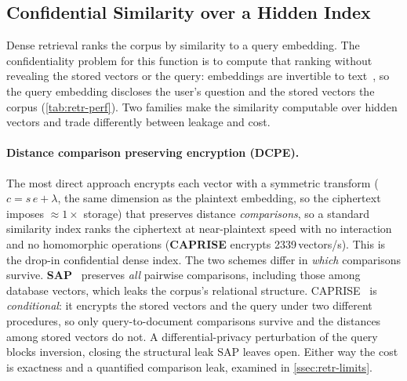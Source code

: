 \subsection{Confidential Similarity over a Hidden Index}
\label{ssec:retr-similarity}
Dense retrieval ranks the corpus by similarity to a query embedding. The confidentiality problem for this
function is to compute that ranking without revealing the stored vectors or the query: embeddings
are invertible to text~\citep{vec2text}, so the query embedding discloses the user's question and
the stored vectors the corpus (\cref{tab:retr-perf}). Two families make the similarity computable
over hidden vectors and trade differently between leakage and cost.

\paragraph{Distance comparison preserving encryption (DCPE).}
The most direct approach encrypts each vector with a symmetric transform
($c = s\,e + \lambda$, the same dimension as the plaintext embedding, so the ciphertext imposes
${\approx}1\times$ storage) that preserves distance \emph{comparisons}, so a standard similarity
index ranks the ciphertext at near-plaintext speed with no interaction and no homomorphic
operations (\textbf{CAPRISE} encrypts 2339\,vectors/s). This is the drop-in confidential dense index. The
two schemes differ in \emph{which} comparisons survive. \textbf{SAP}~\citep{fuchsbauer_sap} preserves
\emph{all} pairwise comparisons, including those among database vectors, which leaks the corpus's
relational structure. CAPRISE~\citep{ye_caprise} is \emph{conditional}: it encrypts the stored vectors and the query
under two different procedures, so only query-to-document comparisons survive and the distances
among stored vectors do not. A differential-privacy perturbation of the query blocks inversion,
closing the structural leak SAP leaves open. Either way the cost is exactness and a quantified
comparison leak, examined in \cref{ssec:retr-limits}.

